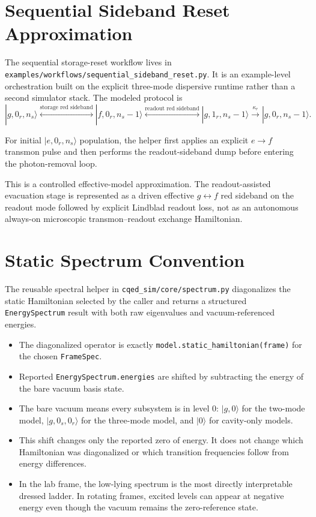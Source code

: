 \documentclass[11pt]{article}
\begin{document}
\section{Sequential Sideband Reset Approximation}
The sequential storage-reset workflow lives in
\texttt{examples/workflows/sequential\_sideband\_reset.py}. It is an example-level
orchestration built on the explicit three-mode dispersive runtime rather than a
second simulator stack. The modeled protocol is
\[
|g,0_r,n_s\rangle
\overset{\text{storage red sideband}}{\leftrightarrow}
|f,0_r,n_s-1\rangle
\overset{\text{readout red sideband}}{\leftrightarrow}
|g,1_r,n_s-1\rangle
\xrightarrow{\kappa_r}
|g,0_r,n_s-1\rangle.
\]

\noindent
For initial \(|e,0_r,n_s\rangle\) population, the helper first applies an explicit
\(e\rightarrow f\) transmon pulse and then performs the readout-sideband dump
before entering the photon-removal loop.

\noindent
This is a controlled effective-model approximation. The readout-assisted evacuation
stage is represented as a driven effective \(g\leftrightarrow f\) red sideband on
the readout mode followed by explicit Lindblad readout loss, not as an autonomous
always-on microscopic transmon--readout exchange Hamiltonian.

\section{Static Spectrum Convention}
The reusable spectral helper in \texttt{cqed\_sim/core/spectrum.py} diagonalizes
the static Hamiltonian selected by the caller and returns a structured
\texttt{EnergySpectrum} result with both raw eigenvalues and vacuum-referenced energies.
\begin{itemize}[leftmargin=1.5em]
  \item The diagonalized operator is exactly \texttt{model.static\_hamiltonian(frame)}
  for the chosen \texttt{FrameSpec}.
  \item Reported \texttt{EnergySpectrum.energies} are shifted by subtracting the
  energy of the bare vacuum basis state.
  \item The bare vacuum means every subsystem is in level \(0\): \(|g,0\rangle\)
  for the two-mode model, \(|g,0_s,0_r\rangle\) for the three-mode model, and
  \(|0\rangle\) for cavity-only models.
  \item This shift changes only the reported zero of energy. It does not change
  which Hamiltonian was diagonalized or which transition frequencies follow from
  energy differences.
  \item In the lab frame, the low-lying spectrum is the most directly interpretable
  dressed ladder. In rotating frames, excited levels can appear at negative energy
  even though the vacuum remains the zero-reference state.
\end{itemize}
\end{document}
